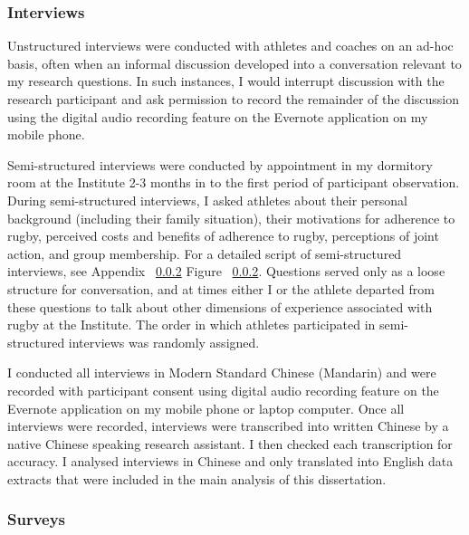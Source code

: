   \subsubsection{Interviews}

Unstructured interviews were conducted with athletes and coaches on an ad-hoc basis, often when an informal discussion developed into a conversation relevant to my research questions. In such instances, I would interrupt discussion with the research participant and ask permission to record the remainder of the discussion using the digital audio recording feature on the Evernote application on my mobile phone.

Semi-structured interviews were conducted by appointment in my dormitory room at the Institute 2-3 months in to the first period of participant observation.  During semi-structured interviews, I asked athletes about their personal background (including their family situation), their motivations for adherence to rugby, perceived costs and benefits of adherence to rugby, perceptions of joint action, and group membership. For a detailed script of semi-structured interviews, see Appendix ~\ref{} Figure ~\ref{}.  Questions served only as a loose structure for conversation, and at times either I or the athlete departed from these questions to talk about other dimensions of experience associated with rugby at the Institute.  The order in which athletes participated in semi-structured interviews was randomly assigned.

I conducted all interviews in Modern Standard Chinese (Mandarin) and were recorded with participant consent using digital audio recording feature on the Evernote application on my mobile phone or laptop computer.  Once all interviews were recorded, interviews were transcribed into written Chinese by a native Chinese speaking research assistant.  I then checked each transcription for accuracy. I analysed interviews in Chinese and only translated into English data extracts that were included in the main analysis of this dissertation.




\subsubsection{Surveys}

